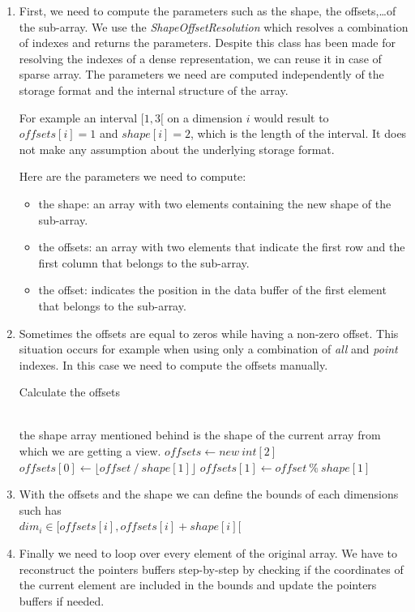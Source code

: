\begin{enumerate}
\item First, we need to compute the parameters such as the shape, the offsets,\dots of the sub-array. We use the \textit{ShapeOffsetResolution} which resolves a combination of indexes and returns the parameters. Despite this class has been made for resolving the indexes of a dense representation, we can reuse it in case of sparse array. The parameters we need are computed independently of the storage format and the internal structure of the array.

For example an interval $[1, 3[$ on a dimension $i$ would result to $offsets[i] = 1$ and $shape[i] = 2$, which is the length of the interval. It does not make any assumption about the underlying storage format.

Here are the parameters we need to compute:
\begin{itemize}
	\item the shape: an array with two elements containing the new shape of the sub-array.
	\item the offsets: an array with two elements that indicate the first row and the first column that belongs to the sub-array.
	\item the offset: indicates the position in the data buffer of the first element that belongs to the sub-array.
\end{itemize}
 \item Sometimes the offsets are equal to zeros while having a non-zero offset. This situation occurs for example when using only a combination of \textit{all} and \textit{point} indexes. In this case we need to compute the offsets manually.
  
 \begin{algorithm}
 	\caption{Calculate the offsets}
 	\label{alg:sparseOffsets2d}
 	\begin{algorithmic}
 		\\
 		\Comment the shape array mentioned behind is the shape of the current array from which we are getting a view.
	 		\State $offsets \gets new\ int[2]$
	 		\State $offsets[0] \gets \lfloor offset\ /\ shape[1]\rfloor$
	 		\State $offsets[1] \gets offset\ \%\ shape[1]$
 		\EndProcedure
 	\end{algorithmic}
 \end{algorithm}
 
\item With the offsets and the shape we can define the bounds of each dimensions such has \\
$dim_{i} \in [offsets[i], offsets[i] + shape[i][$
\item Finally we need to loop over every element of the original array. We have to reconstruct the pointers buffers step-by-step by checking if the coordinates of the current element are included in the bounds and update the pointers buffers if needed.
\end{enumerate}

